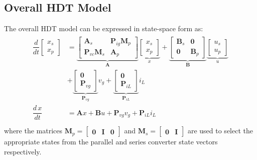 \subsection{Overall HDT Model}
The overall HDT model can be expressed in state-space form as:
\begin{align}
    \begin{aligned}
        \dfrac{d}{dt}
        \begin{bmatrix}
            x_s\\
            x_p
        \end{bmatrix}
        &=
        \underbrace{
        \begin{bmatrix}
            \mathbf{A}_s & \mathbf{P}_{ig}\mathbf{M}_p \\
            \mathbf{P}_{vc}\mathbf{M}_s & \mathbf{A}_p
        \end{bmatrix}
        }_{\mathbf{A}}
        \underbrace{
        \begin{bmatrix}
            x_s\\
            x_p
        \end{bmatrix}
        }_{x}
        +
        \underbrace{
        \begin{bmatrix}
            \mathbf{B}_s & \mathbf{0} \\
            \mathbf{0} & \mathbf{B}_p
        \end{bmatrix}
        }_{\mathbf{B}}
        \underbrace{
        \begin{bmatrix}
            u_s\\
            u_p 
        \end{bmatrix}
        }_{u}
        \\
        &+
        \underbrace{
        \begin{bmatrix}
            \mathbf{0}\\
            \mathbf{P}_{vg}
        \end{bmatrix}
        }_{\mathbf{P}_{vg}}
        v_g
        +
        \underbrace{
        \begin{bmatrix}
            \mathbf{0}\\
            \mathbf{P}_{iL}
        \end{bmatrix}
        }_{\mathbf{P}_{iL}}
        i_L\\
        \dfrac{d\,x}{dt} &= \mathbf{A}x + \mathbf{B}u + \mathbf{P}_{vg}v_g + \mathbf{P}_{iL}i_L \label{eq:HDT_State_Space}\\
    \end{aligned}
\end{align}
where the matrices $\mathbf{M}_p = \begin{bmatrix}\mathbf{0} & \mathbf{I} & \mathbf{0}\end{bmatrix}$ and $\mathbf{M}_s = \begin{bmatrix}\mathbf{0} & \mathbf{I}\end{bmatrix}$ are used to select the appropriate states from the parallel and series converter state vectors respectively.

